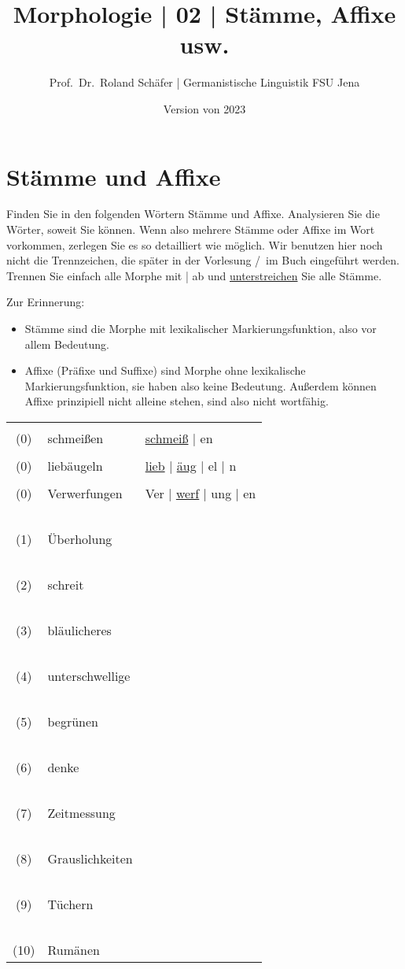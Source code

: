 \documentclass[12pt,a4paper,twoside]{article}
\author{Prof.\ Dr.\ Roland Schäfer | Germanistische Linguistik FSU Jena}
\title{Morphologie | 02 | Stämme, Affixe usw.}
\date{Version von 2023}
\newcommand{\grau}[1]{\textcolor{grau}{#1}}
\newcommand{\Lf}{
  \setlength{\itemsep}{1pt}
  \setlength{\parskip}{0pt}
  \setlength{\parsep}{0pt}
}
\begin{document}
\maketitle

\section{Stämme und Affixe}\label{sec:form}

Finden Sie in den folgenden Wörtern Stämme und Affixe.
Analysieren Sie die Wörter, soweit Sie können.
Wenn also mehrere Stämme oder Affixe im Wort vorkommen, zerlegen Sie es so detailliert wie möglich.
Wir benutzen hier noch nicht die Trennzeichen, die später in der Vorlesung \slash\ im Buch eingeführt werden.
Trennen Sie einfach alle Morphe mit | ab und \ul{unterstreichen} Sie alle Stämme.

Zur Erinnerung:

\begin{itemize}\Lf
  \item Stämme sind die Morphe mit lexikalischer Markierungsfunktion, also vor allem Bedeutung.
  \item Affixe (Präfixe und Suffixe) sind Morphe ohne lexikalische Markierungsfunktion, sie haben also keine Bedeutung.
    Außerdem können Affixe prinzipiell nicht alleine stehen, sind also nicht wortfähig.
\end{itemize}

\begin{tabular}[h]{cp{}p{}}
  &&\\
  (0) & \grau{schmeißen} & \ul{schmeiß} | en\\
  &&\\
  (0) & \grau{liebäugeln} & \ul{lieb} | \ul{äug} | el | n\\
  &&\\
  (0) & \grau{Verwerfungen} & Ver | \ul{werf} | ung | en \\
  && \\
  (1) & Überholung & \\ \cline{3-3}
  && \\
  (2) & schreit & \\ \cline{3-3}
  && \\
  (3) & bläulicheres & \\ \cline{3-3}
  && \\
  (4) & unterschwellige & \\ \cline{3-3}
  && \\
  (5) & begrünen & \\ \cline{3-3}
  && \\
  (6) & denke & \\ \cline{3-3}
  && \\
  (7) & Zeitmessung & \\ \cline{3-3}
  && \\
  (8) & Grauslichkeiten & \\ \cline{3-3}
  && \\
  (9) & Tüchern & \\ \cline{3-3}
  && \\
  (10) & Rumänen & \\ \cline{3-3}
\end{tabular}
\end{document}
